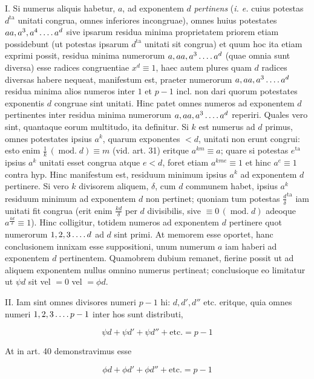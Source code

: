 I. Si numerus aliquis habetur, $a$, ad exponentem $d$ \emph{pertinens} (\emph{i. e.} cuius potestas $d^{\mathrm{ta}}$ unitati congrua, omnes inferiores incongruae), omnes huius potestates $aa,a^3,a^4\mathinner{\ldotp\ldotp\ldotp\ldotp} a^d$ sive ipsarum residua minima proprietatem priorem etiam possidebunt (ut potestas ipsarum $d^{\mathrm{ta}}$ unitati sit congrua) et quum hoc ita etiam exprimi possit, residua minima numerorum $a,aa,a^3\mathinner{\ldotp\ldotp\ldotp\ldotp} a^d$ (quae omnia sunt diversa) esse radices congruentiae $x^d\equiv1$, haec autem plures quam $d$ radices diversas habere nequeat, manifestum est, praeter numerorum $a,aa,a^3\mathinner{\ldotp\ldotp\ldotp\ldotp} a^d$ residua minima alios numeros inter $1$ et $p-1$ incl. non dari quorum potestates exponentis $d$ congruae sint unitati. Hinc patet omnes numeros ad exponentem $d$ pertinentes inter residua minima numerorum $a,aa,a^3\mathinner{\ldotp\ldotp\ldotp\ldotp} a^d$ reperiri. Quales vero sint, quantaque eorum multitudo, ita definitur. Si $k$ est numerus ad $d$ primus, omnes potestates ipsius $a^k$, quarum exponentes $<d$, unitati non erunt congrui: esto enim $\frac{1}{k}\,(\operatorname{mod.}d)\equiv m$ (vid. art. 31) eritque $a^{km}\equiv a$; quare si potestas $e^{\mathrm{ta}}$ ipsius $a^k$ unitati esset congrua atque $e<d$, foret etiam $a^{kme}\equiv1$ et hinc $a^e\equiv1$ contra hyp. Hinc manifestum est, residuum minimum ipsius $a^k$ ad exponentem $d$ pertinere. Si vero $k$ divisorem aliquem, $\delta$, cum $d$ communem habet, ipsius $a^k$ residuum minimum ad exponentem $d$ non pertinet; quoniam tum potestas ${\frac{d}{\delta}}^{\mathrm{ta}}$ iam unitati fit congrua (erit enim $\frac{kd}{\delta}$ per $d$ divisibilis, sive $\equiv0\,(\operatorname{mod.}d)$ adeoque $a^{\frac{kd}{\delta}}\equiv1$). Hinc colligitur, totidem numeros ad exponentem $d$ pertinere quot numerorum $1,2,3\mathinner{\ldotp\ldotp\ldotp\ldotp} d$ ad $d$ sint primi. At memorem esse oportet, hanc conclusionem innixam esse suppositioni, unum numerum $a$ iam haberi ad exponentem $d$ pertinentem. Quamobrem dubium remanet, fierine possit ut ad aliquem exponentem nullus omnino numerus pertineat; conclusioque eo limitatur ut $\psi d$ sit vel $=0$ vel $=\phi d$.


II. Iam sint omnes divisores numeri $p-1$ hi: $d,d',d''$ etc. eritque, quia omnes numeri $1,2,3\mathinner{\ldotp\ldotp\ldotp\ldotp} p-1$ inter hos sunt distributi,

\[\psi d+\psi d'+\psi d''+\text{etc.}=p-1\]

At in art. 40 demonstravimus esse

\[\phi d+\phi d'+\phi d''+\text{etc.}=p-1\]

